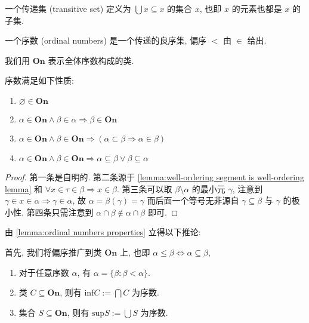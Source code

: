 \begin{definition}
    一个传递集 (transitive set) 定义为 \(\bigcup x \subseteq x\) 的集合 \(x\), 也即 \(x\) 的元素也都是 \(x\) 的子集.
\end{definition}

\begin{definition}
    \label{definition:ordinal}
    一个序数 (ordinal numbers) 是一个传递的良序集, 偏序 \(<\) 由 \(\in\) 给出.
\end{definition}

我们用 \(\mathbf{On}\) 表示全体序数构成的类.

\begin{lemma}
    \label{lemma:ordinal numbers properties}
    序数满足如下性质:

    \begin{enumerate}
        \item \(\varnothing \in \mathbf{On}\) 
        \item \(\alpha \in \mathbf{On} \wedge \beta \in \alpha \Rightarrow \beta \in \mathbf{On}\)
        \item \(\alpha \in \mathbf{On} \wedge \beta \in \mathbf{On} \Rightarrow (\alpha \subset \beta \Rightarrow \alpha \in \beta)\)
        \item \(\alpha \in \mathbf{On} \wedge \beta \in \mathbf{On} \Rightarrow \alpha \subseteq \beta \vee \beta \subseteq \alpha\)
    \end{enumerate}

    \begin{proof}
        第一条是自明的. 第二条源于 \ref{lemma:well-ordering segment is well-ordering lemma} 和
        \(\forall x \in \tau \in \beta \Rightarrow x \in \beta\). 第三条可以取 \(\beta \setminus \alpha\) 的最小元 \(\gamma\),
        注意到 \(\gamma \in x \in \alpha \Rightarrow \gamma \in \alpha\), 故 \(\alpha = \beta(\gamma) = \gamma\) 而后面一个等号无非源自 \(\gamma \subseteq \beta\) 与 \(\gamma\) 的极小性.
        第四条只需注意到 \(\alpha \cap \beta \notin \alpha \cap \beta\) 即可.
    \end{proof}
\end{lemma}

由 \ref{lemma:ordinal numbers properties} 立得以下推论:

\begin{corollary}
    \label{corollary:ordinal numbers properties}
    首先, 我们将偏序推广到类 \(\mathbf{On}\) 上, 也即 \(\alpha \le \beta \Leftrightarrow \alpha \subseteq \beta\),

    \begin{enumerate}
        \item 对于任意序数 \(\alpha\), 有 \(\alpha = \{\beta : \beta < \alpha\}\).
        \item 类 \(C \subseteq \mathbf{On}\), 则有 \(\mathrm{inf} C := \bigcap C\) 为序数.
        \item 集合 \(S \subseteq \mathbf{On}\), 则有 \(\mathrm{sup} S := \bigcup S\) 为序数.
    \end{enumerate}
\end{corollary}

